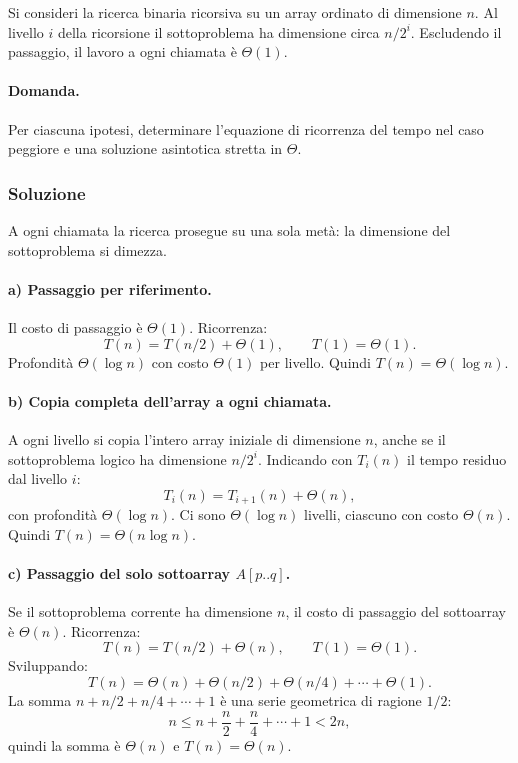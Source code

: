 Si consideri la ricerca binaria ricorsiva su un array ordinato di dimensione $n$. Al livello
$i$ della ricorsione il sottoproblema ha dimensione circa $n/2^i$. Escludendo il passaggio,
il lavoro a ogni chiamata è $\Theta(1)$.

\paragraph{Domanda.}
Per ciascuna ipotesi, determinare l'equazione di ricorrenza del tempo nel caso peggiore e
una soluzione asintotica stretta in $\Theta$.

\subsubsection*{Soluzione}

A ogni chiamata la ricerca prosegue su una sola metà: la dimensione del sottoproblema si dimezza.

\paragraph{a) Passaggio per riferimento.}
Il costo di passaggio è $\Theta(1)$. Ricorrenza:
\[
T(n) = T(n/2) + \Theta(1), \qquad T(1) = \Theta(1).
\]
Profondità $\Theta(\log n)$ con costo $\Theta(1)$ per livello. Quindi $T(n) = \Theta(\log n)$.

\paragraph{b) Copia completa dell'array a ogni chiamata.}
A ogni livello si copia l'intero array iniziale di dimensione $n$, anche se il sottoproblema
logico ha dimensione $n/2^i$. Indicando con $T_i(n)$ il tempo residuo dal livello $i$:
\[
T_i(n) = T_{i+1}(n) + \Theta(n),
\]
con profondità $\Theta(\log n)$. Ci sono $\Theta(\log n)$ livelli, ciascuno con costo
$\Theta(n)$. Quindi $T(n) = \Theta(n \log n)$.

\paragraph{c) Passaggio del solo sottoarray $A[p..q]$.}
Se il sottoproblema corrente ha dimensione $n$, il costo di passaggio del sottoarray è
$\Theta(n)$. Ricorrenza:
\[
T(n) = T(n/2) + \Theta(n), \qquad T(1) = \Theta(1).
\]
Sviluppando:
\[
T(n) = \Theta(n) + \Theta(n/2) + \Theta(n/4) + \cdots + \Theta(1).
\]
La somma $n + n/2 + n/4 + \cdots + 1$ è una serie geometrica di ragione $1/2$:
\[
n \leq n + \frac{n}{2} + \frac{n}{4} + \cdots + 1 < 2n,
\]
quindi la somma è $\Theta(n)$ e $T(n) = \Theta(n)$.

